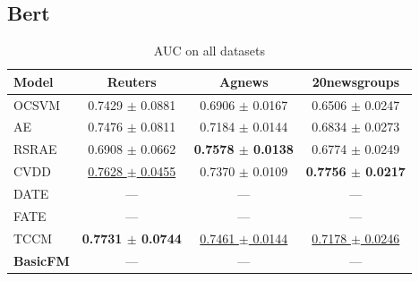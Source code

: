 \subsection {Bert}

\begin{table}[H]
\centering
\caption{AUC on all datasets}
\begin{tabular}{lccc}
\toprule
Model & Reuters & Agnews & 20newsgroups \\
\midrule
OCSVM & 0.7429 $\pm$ 0.0881 & 0.6906 $\pm$ 0.0167 & 0.6506 $\pm$ 0.0247 \\
AE & 0.7476 $\pm$ 0.0811 & 0.7184 $\pm$ 0.0144 & 0.6834 $\pm$ 0.0273 \\
\midrule
RSRAE & 0.6908 $\pm$ 0.0662 & \textbf{0.7578 $\pm$ 0.0138} & 0.6774 $\pm$ 0.0249 \\
CVDD & \underline{0.7628 $\pm$ 0.0455} & 0.7370 $\pm$ 0.0109 & \textbf{0.7756 $\pm$ 0.0217} \\
DATE & — & — & — \\
FATE & — & — & — \\
\midrule
TCCM & \textbf{0.7731 $\pm$ 0.0744} & \underline{0.7461 $\pm$ 0.0144} & \underline{0.7178 $\pm$ 0.0246} \\
\textbf{BasicFM} & — & — & — \\
\bottomrule
\end{tabular}
\label{tab:global}
\end{table}

